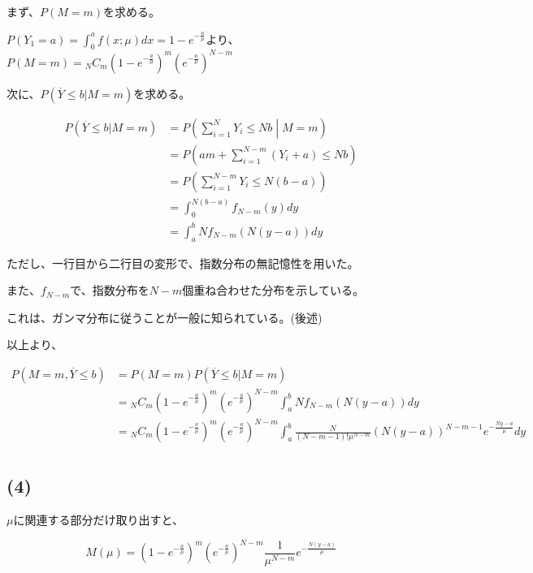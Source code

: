 \documentclass[a4paper, 10pt, dvipdfmx]{jlreq}
\begin{document}
まず、$P(M=m)$を求める。

$P(Y_1=a)=\int_0^a{f(x;\mu)}dx=1-e^{-\frac{a}{\mu}}$より、$P(M=m) = {}_N C_m (1-e^{-\frac{a}{\mu}})^m(e^{-\frac{a}{\mu}})^{N-m}$

次に、$P(\overline{Y}\leq b | M=m)$を求める。

\begin{align*}
  P(\overline{Y}\leq b | M=m) & = P\left( \sum_{i=1}^N Y_i \leq Nb \middle| M=m \right)  \\
                              & = P\left( am + \sum_{i=1}^{N-m} (Y_i+a)  \leq Nb \right) \\
                              & = P\left( \sum_{i=1}^{N-m} Y_i  \leq N(b-a) \right)      \\
                              & = \int_0^{N(b-a)} f_{N-m}(y) dy                          \\
                              & = \int_a^{b} Nf_{N-m}(N(y-a)) dy
\end{align*}

ただし、一行目から二行目の変形で、指数分布の無記憶性を用いた。

また、$f_{N-m}$で、指数分布を$N-m$個重ね合わせた分布を示している。

これは、ガンマ分布に従うことが一般に知られている。(後述)

以上より、

\begin{align*}
  P(M=m,\overline{Y}\leq b) & = P(M=m)P(\overline{Y} \leq b|M=m)                                                                                                            \\
                            & = {}_NC_m (1-e^{-\frac{a}{\mu}})^m(e^{-\frac{a}{\mu}})^{N-m} \int_a^{b} N f_{N-m}(N(y-a)) dy                                                  \\
                            & = {}_NC_m (1-e^{-\frac{a}{\mu}})^m(e^{-\frac{a}{\mu}})^{N-m} \int_a^{b} \frac{N}{(N-m-1)!\mu^{N-m}} (N(y-a))^{N-m-1} e^{-\frac{Ny-a}{\mu}} dy \\
\end{align*}

\subsection*{(4)}

$\mu$に関連する部分だけ取り出すと、

\begin{equation*}
  M(\mu)   = (1-e^{-\frac{a}{\mu}})^m(e^{-\frac{a}{\mu}})^{N-m}  \frac{1}{\mu^{N-m}} e^{-\frac{N(y-a)}{\mu}}
\end{equation*}
\end{document}

